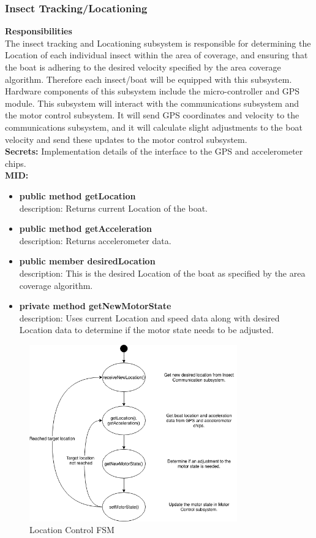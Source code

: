 \documentclass[11pt]{article}
\begin{document}
\subsubsection{Insect Tracking/Locationing}
\textbf{Responsibilities}\\
The insect tracking and Locationing subsystem is responsible for determining the Location of each
individual insect within the area of coverage, and ensuring that the boat is adhering to the desired
velocity specified by the area coverage algorithm. Therefore each insect/boat will be equipped with
this subsystem. Hardware components of this subsystem include the micro-controller and GPS
module. This subsystem will interact with the communications subsystem and the motor control subsystem. It will send GPS coordinates and velocity to the communications subsystem, and it
will calculate slight adjustments to the boat velocity and send these updates to the motor control
subsystem. \\
\newline
\textbf{Secrets: } Implementation details of the interface to the GPS and accelerometer chips. \\
\newline
\textbf{MID:}
\begin{itemize}
    \item \textbf{public method getLocation} \\ description: Returns current Location of the boat.
    \item \textbf{public method getAcceleration} \\ description: Returns accelerometer data.
    \item \textbf{public member desiredLocation} \\ description: This is the desired Location of the boat as specified by the area coverage algorithm.
    \item \textbf{private method getNewMotorState} \\ description: Uses current Location and speed data along with desired Location data to determine if the motor state needs to be adjusted.
\end{itemize}
\begin{figure}[H]
   \centering
   \includegraphics[width=0.8\textwidth]{diagram/location_ctrl_fsm.png}
   \caption{Location Control FSM}
\end{figure}
\end{document}
